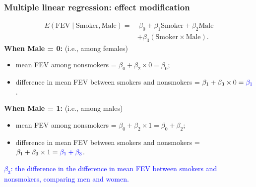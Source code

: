 \documentclass[12pt, 
hyperref={colorlinks=true, linkcolor=blue, urlcolor=cyan},dvipsnames]{beamer}
\begin{document}
\begin{frame}
\frametitle{Multiple linear regression: effect modification}
\vspace{-0.7cm}
\begin{align*}
E(\text{FEV} \mid \text{Smoker}, \text{Male}) = & \ \beta_0 + \beta_1 \text{Smoker} + \beta_2 \text{Male}\\
& + \beta_3 (\text{Smoker} \times \text{Male}).
\end{align*}
\vspace{-0.3cm}
\textbf{When Male = 0:}  (i.e., among females) \vspace{-0.2cm}
\begin{itemize}
\item mean FEV among nonsmokers = $\beta_0 + \beta_2 \times 0 = \beta_0$; 
\item difference in mean FEV between smokers and nonsmokers = $\beta_1 + \beta_3 \times 0 = \color{blue}{\beta_1}$.
\end{itemize}

\textbf{When Male = 1:}  (i.e., among males) \vspace{-0.2cm}
\begin{itemize}
\item mean FEV among nonsmokers = $\beta_0 + \beta_2 \times 1 = \beta_0 + \beta_2$; 
\item difference in mean FEV between smokers and nonsmokers = $\beta_1 + \beta_3 \times 1 = \color{blue}{\beta_1 + \beta_3}$.
\end{itemize}

\textcolor{blue}{$\beta_3$: the difference in the difference in mean FEV between smokers and nonsmokers, comparing men and women.}
\end{frame}
\end{document}
